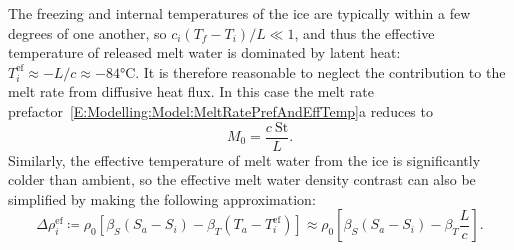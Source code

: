 \documentclass[openacc]{rsproca_new}%
\begin{document}
The freezing and internal temperatures of the ice are typically within a few degrees of one another, so $c_i(T_f - T_i)/ L \ll 1$, and thus the effective temperature of released melt water is dominated by latent heat: $T_i^{\text{ef}} \approx -L/c \approx -84\si{\celsius}$. It is therefore reasonable to neglect the contribution to the melt rate from diffusive heat flux. In this case the melt rate prefactor~\eqref{E:Modelling:Model:MeltRatePrefAndEffTemp}a reduces to
\begin{equation}\label{E:Modelling:Model:Closure:M0_simple}
 M_0 = \frac{c~\mathrm{St}}{L}.
\end{equation}
Similarly, the effective temperature of melt water from the ice is significantly colder than ambient, so the effective melt water density contrast can also be simplified by making the following approximation:
\begin{equation}\label{E:Modelling:Model:EffectiveDensity}
\Delta \rho_i^{\text{ef}} \coloneqq \rho_0 \left[\beta_S\left(S_a - S_i\right) - \beta_T\left(T_a - T_i^{\text{ef}}\right)\right]  \approx \rho_0 \left[\beta_S\left(S_a - S_i\right) - \beta_T\frac{L}{c}\right].
\end{equation}
\end{document}
